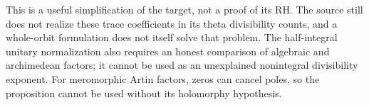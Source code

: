 This is a useful simplification of the target, not a proof of its RH.
The source still does not realize these trace coefficients in its theta
divisibility counts, and a whole-orbit formulation does not itself solve
that problem. The half-integral unitary normalization also requires an
honest comparison of algebraic and archimedean factors; it cannot be used
as an unexplained nonintegral divisibility exponent. For meromorphic
Artin factors, zeros can cancel poles, so the proposition cannot be used
without its holomorphy hypothesis.
